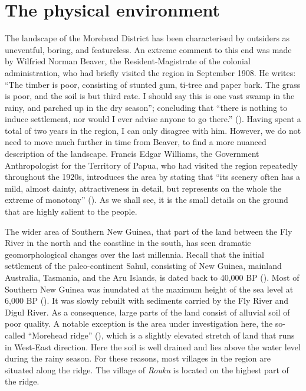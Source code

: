 \section{The physical environment}\label{sec:physicalenvironment}
The landscape of the Morehead District has been characterised by outsiders as uneventful, boring, and featureless. An extreme comment to this end was made by Wilfried Norman Beaver, the Resident-Magistrate of the colonial administration, who had briefly visited the region in September 1908. He writes: ``The timber is poor, consisting of stunted gum, ti-tree and paper bark. The grass is poor, and the soil is but third rate. I should say this is one vast swamp in the rainy, and parched up in the dry season''; concluding that ``there is nothing to induce settlement, nor would I ever advise anyone to go there.'' (\cite[12]{Murray:1909ly}). Having spent a total of two years in the region, I can only disagree with him. However, we do not need to move much further in time from Beaver, to find a more nuanced description of the landscape. Francis Edgar Williams, the Government Anthropologist for the Territory of Papua, who had visited the region repeatedly throughout the 1920s, introduces the area by stating that ``its scenery often has a mild, almost dainty, attractiveness in detail, but represents on the whole the extreme of monotony'' (\citeyear[1]{Williams:1936hb}). As we shall see, it is the small details on the ground that are highly salient to the people.

The wider area of Southern New Guinea, that part of the land between the Fly River in the north and the coastline in the south, has seen dramatic geomorphological changes over the last millennia. Recall that the initial settlement of the paleo-continent Sahul, consisting of New Guinea, mainland Australia, Tasmania, and the Aru Islands, is dated back to 40,000 BP (\cite{Allen:2008wi}). Most of Southern New Guinea was inundated at the maximum height of the sea level at 6,000 BP (\cite{Chappell:2005coastal}). It was slowly rebuilt with sediments carried by the Fly River and Digul River. As a consequence, large parts of the land consist of alluvial soil of poor quality. A notable exception is the area under investigation here, the so-called ``Morehead ridge'' (\cite[15]{Paijmans:1971morehead}), which is a slightly elevated stretch of land that runs in West-East direction. Here the soil is well drained and lies above the water level during the rainy season. For these reasons, most villages in the region are situated along the ridge. The village of \textit{Rouku} is located on the highest part of the ridge.


